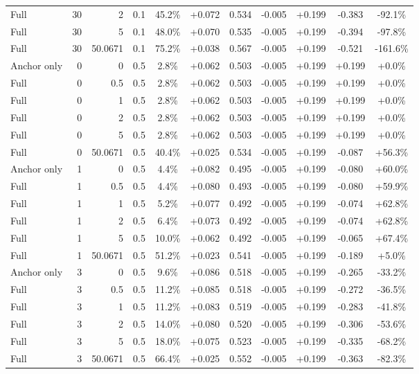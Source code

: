 \begin{table}[htbp]
\begin{tabular}{lrrrccccccc}
Full & 30 & 2 & 0.1 & 45.2\% & +0.072 & 0.534 & -0.005 & +0.199 & -0.383 & -92.1\% \\
Full & 30 & 5 & 0.1 & 48.0\% & +0.070 & 0.535 & -0.005 & +0.199 & -0.394 & -97.8\% \\
Full & 30 & 50.0671 & 0.1 & 75.2\% & +0.038 & 0.567 & -0.005 & +0.199 & -0.521 & -161.6\% \\
Anchor only & 0 & 0 & 0.5 & 2.8\% & +0.062 & 0.503 & -0.005 & +0.199 & +0.199 & +0.0\% \\
Full & 0 & 0.5 & 0.5 & 2.8\% & +0.062 & 0.503 & -0.005 & +0.199 & +0.199 & +0.0\% \\
Full & 0 & 1 & 0.5 & 2.8\% & +0.062 & 0.503 & -0.005 & +0.199 & +0.199 & +0.0\% \\
Full & 0 & 2 & 0.5 & 2.8\% & +0.062 & 0.503 & -0.005 & +0.199 & +0.199 & +0.0\% \\
Full & 0 & 5 & 0.5 & 2.8\% & +0.062 & 0.503 & -0.005 & +0.199 & +0.199 & +0.0\% \\
Full & 0 & 50.0671 & 0.5 & 40.4\% & +0.025 & 0.534 & -0.005 & +0.199 & -0.087 & +56.3\% \\
Anchor only & 1 & 0 & 0.5 & 4.4\% & +0.082 & 0.495 & -0.005 & +0.199 & -0.080 & +60.0\% \\
Full & 1 & 0.5 & 0.5 & 4.4\% & +0.080 & 0.493 & -0.005 & +0.199 & -0.080 & +59.9\% \\
Full & 1 & 1 & 0.5 & 5.2\% & +0.077 & 0.492 & -0.005 & +0.199 & -0.074 & +62.8\% \\
Full & 1 & 2 & 0.5 & 6.4\% & +0.073 & 0.492 & -0.005 & +0.199 & -0.074 & +62.8\% \\
Full & 1 & 5 & 0.5 & 10.0\% & +0.062 & 0.492 & -0.005 & +0.199 & -0.065 & +67.4\% \\
Full & 1 & 50.0671 & 0.5 & 51.2\% & +0.023 & 0.541 & -0.005 & +0.199 & -0.189 & +5.0\% \\
Anchor only & 3 & 0 & 0.5 & 9.6\% & +0.086 & 0.518 & -0.005 & +0.199 & -0.265 & -33.2\% \\
Full & 3 & 0.5 & 0.5 & 11.2\% & +0.085 & 0.518 & -0.005 & +0.199 & -0.272 & -36.5\% \\
Full & 3 & 1 & 0.5 & 11.2\% & +0.083 & 0.519 & -0.005 & +0.199 & -0.283 & -41.8\% \\
Full & 3 & 2 & 0.5 & 14.0\% & +0.080 & 0.520 & -0.005 & +0.199 & -0.306 & -53.6\% \\
Full & 3 & 5 & 0.5 & 18.0\% & +0.075 & 0.523 & -0.005 & +0.199 & -0.335 & -68.2\% \\
Full & 3 & 50.0671 & 0.5 & 66.4\% & +0.025 & 0.552 & -0.005 & +0.199 & -0.363 & -82.3\% \\

\end{tabular}
\end{table}
